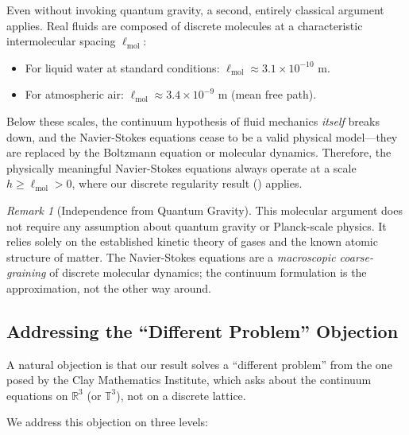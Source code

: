 \documentclass[12pt, a4paper]{article}
\theoremstyle{plain}
\theoremstyle{definition}
\theoremstyle{remark}
\newtheorem{remark}[theorem]{Remark}
\newcommand{\R}{\mathbb{R}}
\newcommand{\T}{\mathbb{T}}
\begin{document}
Even without invoking quantum gravity, a second, entirely classical argument
applies. Real fluids are composed of discrete molecules at a characteristic
intermolecular spacing $\ell_{\text{mol}}$:
\begin{itemize}
  \item For liquid water at standard conditions:
    $\ell_{\text{mol}} \approx 3.1 \times 10^{-10}$ m.
  \item For atmospheric air:
    $\ell_{\text{mol}} \approx 3.4 \times 10^{-9}$ m (mean free path).
\end{itemize}
Below these scales, the continuum hypothesis of fluid mechanics
\emph{itself} breaks down, and the Navier-Stokes equations cease to be a
valid physical model---they are replaced by the Boltzmann equation or
molecular dynamics. Therefore, the physically meaningful Navier-Stokes
equations always operate at a scale $h \geq \ell_{\text{mol}} > 0$,
where our discrete regularity result () applies.

\begin{remark}[Independence from Quantum Gravity]
  This molecular argument does not require any assumption about quantum
  gravity or Planck-scale physics. It relies solely on the established
  kinetic theory of gases \citep{ChorinMarsden1993} and the known atomic
  structure of matter. The Navier-Stokes equations are a \emph{macroscopic
  coarse-graining} of discrete molecular dynamics; the continuum formulation
  is the approximation, not the other way around.
\end{remark}

\subsection{Addressing the ``Different Problem'' Objection}\label{subsec:objection}

A natural objection is that our result solves a ``different problem'' from the
one posed by the Clay Mathematics Institute, which asks about the continuum
equations on $\R^3$ (or $\T^3$), not on a discrete lattice.

We address this objection on three levels:
\end{document}
